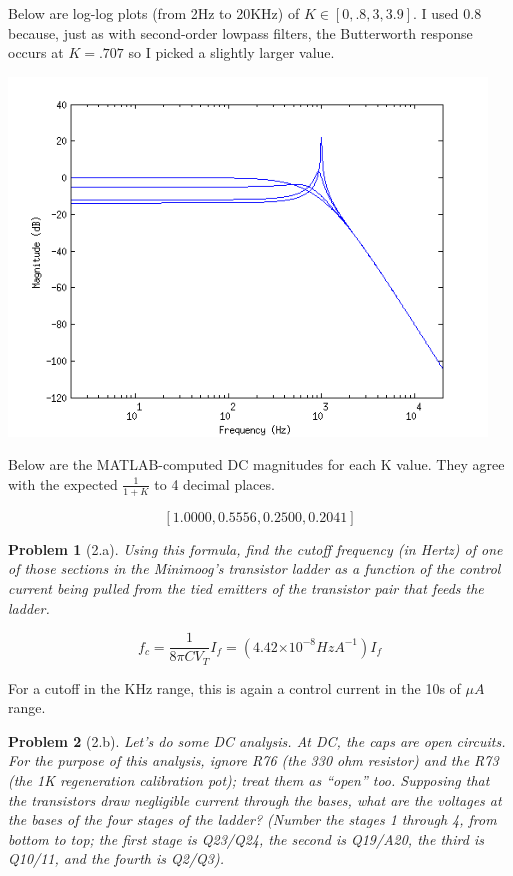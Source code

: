 \documentclass[12pt]{article}
\providecommand{\e}[1]{\ensuremath{\times 10^{#1}}}
\newtheorem*{prob}{Problem}
\begin{document}
Below are log-log plots (from 2Hz to 20KHz) of $K \in [0, .8, 3, 3.9]$. I used $0.8$ because, just as with second-order lowpass filters, the Butterworth response occurs at $K=.707$ so I picked a slightly larger value.  

\begin{center}
\includegraphics[width=5in]{graphs.png}
\end{center}

Below are the MATLAB-computed DC magnitudes for each K value. They agree with the expected $\frac{1}{1+K}$ to 4 decimal places.

\[ [1.0000, 0.5556, 0.2500, 0.2041] \]


\begin{prob}[2.a]{
Using this formula, find the cutoff frequency (in Hertz) of one of those sections in the Minimoog's transistor ladder as a function of the control current being pulled from the tied emitters of the transistor pair that feeds the ladder.
}\end{prob}

\[ f_c = \frac{1}{8\pi C V_T}I_f = (4.42\e{-8}HzA^{-1}) I_f \]

For a cutoff in the KHz range, this is again a control current in the 10s of $\mu A$ range.

\begin{prob}[2.b]{
Let's do some DC analysis. At DC, the caps are open circuits. For the purpose of this analysis, ignore R76 (the 330 ohm resistor) and the R73 (the 1K regeneration calibration pot); treat them as ``open'' too. Supposing that the transistors draw negligible current through the bases, what are the voltages at the bases of the four stages of the ladder? (Number the stages 1 through 4, from bottom to top; the first stage is Q23/Q24, the second is Q19/A20, the third is Q10/11, and the fourth is Q2/Q3).
}\end{prob}
\end{document}
